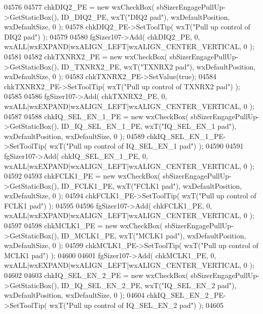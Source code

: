 \begin{DoxyCode}
04576     
04577     chkDIQ2_PE = \textcolor{keyword}{new} wxCheckBox( sbSizerEngagePullUp->GetStaticBox(), ID_DIQ2_PE, wxT(\textcolor{stringliteral}{"DIQ2 pad"}), 
      wxDefaultPosition, wxDefaultSize, 0 );
04578     chkDIQ2_PE->SetToolTip( wxT(\textcolor{stringliteral}{"Pull up control of DIQ2 pad"}) );
04579     
04580     fgSizer107->Add( chkDIQ2_PE, 0, wxALL|wxEXPAND|wxALIGN\_LEFT|wxALIGN\_CENTER\_VERTICAL, 0 );
04581     
04582     chkTXNRX2_PE = \textcolor{keyword}{new} wxCheckBox( sbSizerEngagePullUp->GetStaticBox(), 
      ID_TXNRX2_PE, wxT(\textcolor{stringliteral}{"TXNRX2 pad"}), wxDefaultPosition, wxDefaultSize, 0 );
04583     chkTXNRX2_PE->SetValue(\textcolor{keyword}{true}); 
04584     chkTXNRX2_PE->SetToolTip( wxT(\textcolor{stringliteral}{"Pull up control of TXNRX2 pad"}) );
04585     
04586     fgSizer107->Add( chkTXNRX2_PE, 0, wxALL|wxEXPAND|wxALIGN\_LEFT|wxALIGN\_CENTER\_VERTICAL, 0 );
04587     
04588     chkIQ_SEL_EN_1_PE = \textcolor{keyword}{new} wxCheckBox( sbSizerEngagePullUp->GetStaticBox(), 
      ID_IQ_SEL_EN_1_PE, wxT(\textcolor{stringliteral}{"IQ\_SEL\_EN\_1 pad"}), wxDefaultPosition, wxDefaultSize, 0 );
04589     chkIQ_SEL_EN_1_PE->SetToolTip( wxT(\textcolor{stringliteral}{"Pull up control of IQ\_SEL\_EN\_1 pad"}) );
04590     
04591     fgSizer107->Add( chkIQ_SEL_EN_1_PE, 0, wxALL|wxEXPAND|wxALIGN\_LEFT|wxALIGN\_CENTER\_VERTICAL, 0 );
04592     
04593     chkFCLK1_PE = \textcolor{keyword}{new} wxCheckBox( sbSizerEngagePullUp->GetStaticBox(), 
      ID_FCLK1_PE, wxT(\textcolor{stringliteral}{"FCLK1 pad"}), wxDefaultPosition, wxDefaultSize, 0 );
04594     chkFCLK1_PE->SetToolTip( wxT(\textcolor{stringliteral}{"Pull up control of FCLK1 pad"}) );
04595     
04596     fgSizer107->Add( chkFCLK1_PE, 0, wxALL|wxEXPAND|wxALIGN\_LEFT|wxALIGN\_CENTER\_VERTICAL, 0 );
04597     
04598     chkMCLK1_PE = \textcolor{keyword}{new} wxCheckBox( sbSizerEngagePullUp->GetStaticBox(), 
      ID_MCLK1_PE, wxT(\textcolor{stringliteral}{"MCLK1 pad"}), wxDefaultPosition, wxDefaultSize, 0 );
04599     chkMCLK1_PE->SetToolTip( wxT(\textcolor{stringliteral}{"Pull up control of MCLK1 pad"}) );
04600     
04601     fgSizer107->Add( chkMCLK1_PE, 0, wxALL|wxEXPAND|wxALIGN\_LEFT|wxALIGN\_CENTER\_VERTICAL, 0 );
04602     
04603     chkIQ_SEL_EN_2_PE = \textcolor{keyword}{new} wxCheckBox( sbSizerEngagePullUp->GetStaticBox(), 
      ID_IQ_SEL_EN_2_PE, wxT(\textcolor{stringliteral}{"IQ\_SEL\_EN\_2 pad"}), wxDefaultPosition, wxDefaultSize, 0 );
04604     chkIQ_SEL_EN_2_PE->SetToolTip( wxT(\textcolor{stringliteral}{"Pull up control of IQ\_SEL\_EN\_2 pad"}) );
04605     

\end{DoxyCode}

